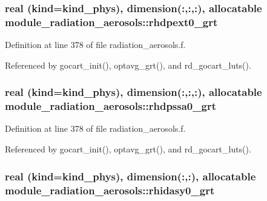 \subsubsection[{\texorpdfstring{rhdpext0\+\_\+grt}{rhdpext0_grt}}]{\setlength{\rightskip}{0pt plus 5cm}real (kind=kind\+\_\+phys), dimension(\+:,\+:,\+:), allocatable module\+\_\+radiation\+\_\+aerosols\+::rhdpext0\+\_\+grt\hspace{0.3cm}{\ttfamily [private]}}\hypertarget{group__module__radiation__aerosols_ga35a5c7b67a3cf11c5016a693e115d384}{}\label{group__module__radiation__aerosols_ga35a5c7b67a3cf11c5016a693e115d384}


Definition at line 378 of file radiation\+\_\+aerosols.\+f.



Referenced by gocart\+\_\+init(), optavg\+\_\+grt(), and rd\+\_\+gocart\+\_\+luts().

\subsubsection[{\texorpdfstring{rhdpssa0\+\_\+grt}{rhdpssa0_grt}}]{\setlength{\rightskip}{0pt plus 5cm}real (kind=kind\+\_\+phys), dimension(\+:,\+:,\+:), allocatable module\+\_\+radiation\+\_\+aerosols\+::rhdpssa0\+\_\+grt\hspace{0.3cm}{\ttfamily [private]}}\hypertarget{group__module__radiation__aerosols_ga40d680662eadf30221997dadcce734b1}{}\label{group__module__radiation__aerosols_ga40d680662eadf30221997dadcce734b1}


Definition at line 378 of file radiation\+\_\+aerosols.\+f.



Referenced by gocart\+\_\+init(), optavg\+\_\+grt(), and rd\+\_\+gocart\+\_\+luts().

\subsubsection[{\texorpdfstring{rhidasy0\+\_\+grt}{rhidasy0_grt}}]{\setlength{\rightskip}{0pt plus 5cm}real (kind=kind\+\_\+phys), dimension(\+:,\+:), allocatable module\+\_\+radiation\+\_\+aerosols\+::rhidasy0\+\_\+grt\hspace{0.3cm}{\ttfamily [private]}}\hypertarget{group__module__radiation__aerosols_ga8491a714c86e9bd7ebdc401662f5068e}{}\label{group__module__radiation__aerosols_ga8491a714c86e9bd7ebdc401662f5068e}


